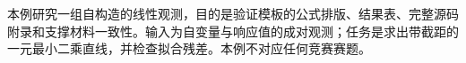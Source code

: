 本例研究一组自构造的线性观测，目的是验证模板的公式排版、结果表、完整源码附录和支撑材料一致性。输入为自变量与响应值的成对观测；任务是求出带截距的一元最小二乘直线，并检查拟合残差。本例不对应任何竞赛赛题。
